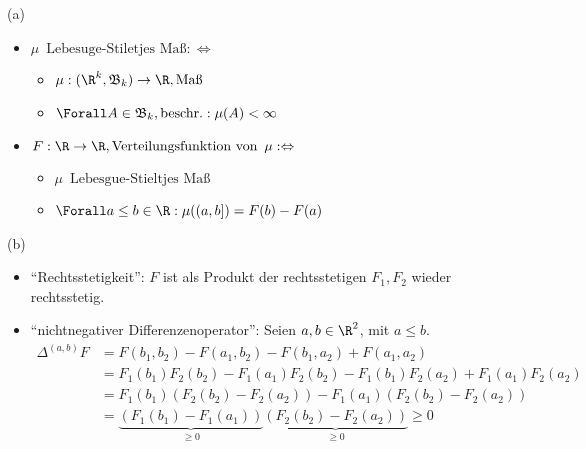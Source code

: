\begin{solution}

(a)

\begin{itemize}

  \item $\mu \enspace \text{Lebesuge-Stiletjes Maß} : \Leftrightarrow$
  \begin{itemize}
    \item $\mu: (\R^k, \mathfrak{B}_k) \to \R, \text{Maß}$
    \item $\Forall A \in \mathfrak{B}_k, \text{beschr.}: \mu(A) < \infty$
  \end{itemize}

  \item $F: \R \to \R, \text{Verteilungsfunktion von} \enspace \mu : \Leftrightarrow$
  \begin{itemize}
    \item $\mu \enspace \text{Lebesgue-Stieltjes Maß}$
    \item $\Forall a \leq b \in \R: \mu((a, b]) = F(b) - F(a)$
  \end{itemize}

\end{itemize}

(b)

\begin{itemize}

  \item \enquote{Rechtsstetigkeit}: $F$ ist als Produkt der rechtsstetigen $F_1, F_2$ wieder rechtsstetig.

  \item \enquote{nichtnegativer Differenzenoperator}: Seien $a, b \in \R^2$, mit $a \leq b$.
  \begin{align*}
    \Delta^{(a, b)} F
    & =
    F(b_1, b_2) - F(a_1, b_2) - F(b_1, a_2) + F(a_1, a_2) \\
    & =
    F_1(b_1) F_2(b_2) -
    F_1(a_1) F_2(b_2) -
    F_1(b_1) F_2(a_2) +
    F_1(a_1) F_2(a_2) \\
    & =
    F_1(b_1) (F_2(b_2) - F_2(a_2)) -
    F_1(a_1) (F_2(b_2) - F_2(a_2)) \\
    & =
    \underbrace{(F_1(b_1) - F_1(a_1))}_{\geq 0}
    \underbrace{(F_2(b_2) - F_2(a_2))}_{\geq 0}
    \geq 0
  \end{align*}

\end{itemize}

\end{solution}

